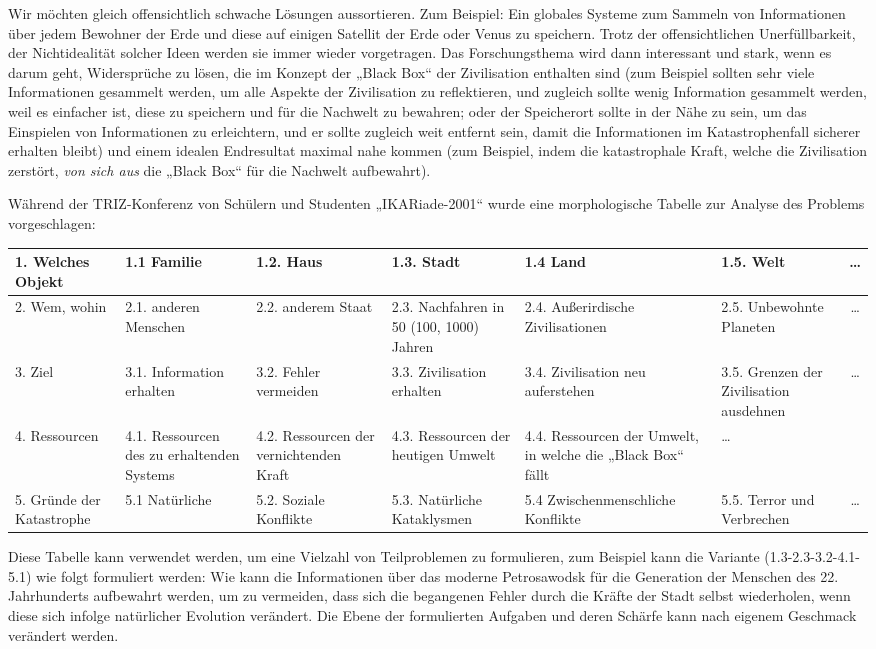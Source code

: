 \documentclass[11pt,a4paper]{article}
\begin{document}
Wir möchten gleich offensichtlich schwache Lösungen aussortieren. Zum
Beispiel: Ein globales Systeme zum Sammeln von Informationen über jedem
Bewohner der Erde und diese auf einigen Satellit der Erde oder Venus zu
speichern. Trotz der offensichtlichen Unerfüllbarkeit, der Nichtidealität
solcher Ideen werden sie immer wieder vorgetragen. Das Forschungsthema wird
dann interessant und stark, wenn es darum geht, Widersprüche zu lösen, die im
Konzept der „Black Box“ der Zivilisation enthalten sind (zum Beispiel sollten
sehr viele Informationen gesammelt werden, um alle Aspekte der Zivilisation zu
reflektieren, und zugleich sollte wenig Information gesammelt werden, weil es
einfacher ist, diese zu speichern und für die Nachwelt zu bewahren; oder der
Speicherort sollte in der Nähe zu sein, um das Einspielen von Informationen zu
erleichtern, und er sollte zugleich weit entfernt sein, damit die
Informationen im Katastrophenfall sicherer erhalten bleibt) und einem idealen
Endresultat maximal nahe kommen (zum Beispiel, indem die katastrophale Kraft,
welche die Zivilisation zerstört, \emph{von sich aus} die „Black Box“ für die
Nachwelt aufbewahrt).

Während der TRIZ-Konferenz von Schülern und Studenten „IKARiade-2001“ wurde
eine morphologische Tabelle zur Analyse des Problems vorgeschlagen:

\begin{center}\small
  \begin{tabular}{|*{6}{>{\raggedright}p{1.9cm}|}c|}\hline
1. Welches Objekt & 1.1 Familie & 1.2. Haus & 1.3. Stadt & 1.4 Land &
1.5. Welt & \ldots \\\hline 
2. Wem, wohin & 2.1. anderen Menschen & 2.2. anderem Staat & 2.3. Nachfahren
in 50 (100, 1000) Jahren & 2.4. Außerirdische Zivilisationen & 2.5. Unbewohnte
Planeten& \ldots \\\hline
3. Ziel & 3.1. Information erhalten & 3.2. Fehler vermeiden &
3.3. Zivilisation erhalten & 3.4. Zivilisation neu auferstehen & 3.5. Grenzen
der Zivilisation ausdehnen& \ldots \\\hline
4. Ressourcen & 4.1. Ressourcen des zu erhaltenden Systems & 4.2. Ressourcen
der vernichtenden Kraft & 4.3. Ressourcen der heutigen Umwelt &
4.4. Ressourcen der Umwelt, in welche die „Black Box“ fällt & \ldots &
\\\hline  
5. Gründe der Katastrophe & 5.1 Natürliche & 5.2. Soziale Konflikte &
5.3. Natürliche Kataklysmen & 5.4 Zwischenmenschliche Konflikte & 5.5. Terror
und Verbrechen & \ldots \\\hline
  \end{tabular}
\end{center}
Diese Tabelle kann verwendet werden, um eine Vielzahl von Teilproblemen zu
formulieren, zum Beispiel kann die Variante (1.3-2.3-3.2-4.1-5.1) wie folgt
formuliert werden: Wie kann die Informationen über das moderne Petrosawodsk
für die Generation der Menschen des 22. Jahrhunderts aufbewahrt werden, um zu
vermeiden, dass sich die begangenen Fehler durch die Kräfte der Stadt selbst
wiederholen, wenn diese sich infolge natürlicher Evolution verändert. Die
Ebene der formulierten Aufgaben und deren Schärfe kann nach eigenem Geschmack
verändert werden.
\end{document}
